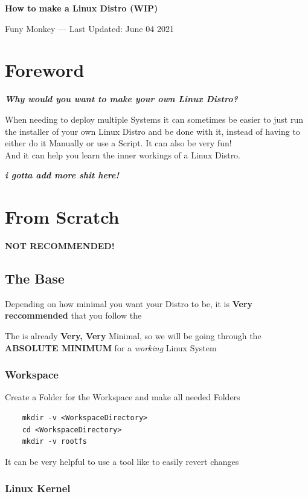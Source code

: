 \documentclass{article}
\renewcommand{\maketitle}{
	\begin{center}
		{\huge\bfseries
		How to make a Linux Distro (WIP)}
		\vspace{.25em}

		Funy Monkey --- Last Updated: June 04 2021
	\end{center}
}
\begin{document}
\maketitle
\tableofcontents

\section{Foreword}
	\textit{\textbf{Why would you want to make your own Linux Distro?}}

	When needing to deploy multiple Systems it can sometimes be easier to just run the installer of your own Linux Distro and be done with it, instead of having to either do it Manually or use a Script. It can also be very fun!
	\\And it can help you learn the inner workings of a Linux Distro.

	\textit{\textbf{i gotta add more shit here!}}

\section{From Scratch}
\label{Scratch}
\textbf{NOT RECOMMENDED!}
\subsection{The Base}
	\label{ScratchBase}
	Depending on how minimal you want your Distro to be, it is \textbf{Very reccommended} that you follow the 

	The  is already \textbf{Very, Very} Minimal, so we will be going through the \textbf{ABSOLUTE MINIMUM} for a \textit{working} Linux System 
		\subsubsection{Workspace}
			Create a Folder for the Workspace and make all needed Folders
			
			\begin{lstlisting}
	mkdir -v <WorkspaceDirectory>
	cd <WorkspaceDirectory>
	mkdir -v rootfs
			\end{lstlisting}

			It can be very helpful to use a tool like  to easily revert changes
		\subsubsection{Linux Kernel}
\end{document}
